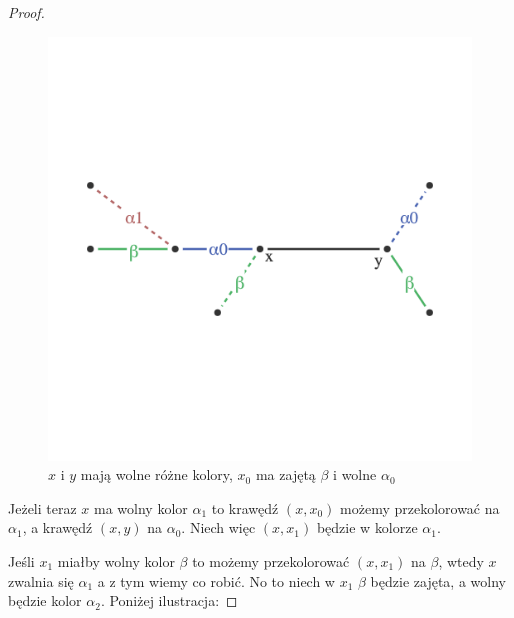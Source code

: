 \begin{proof}
        \begin{figure}[ht]
            \centering
            \includegraphics[scale=0.6]{chapters/dyskretna/colours/vizing/images/step_one.png}
            \caption{$x$ i $y$ mają wolne różne kolory, $x_0$ ma zajętą $\beta$ i wolne $\alpha_0$}
        \end{figure}
        
        Jeżeli teraz $x$ ma wolny kolor $\alpha_1$ to krawędź $(x, x_0)$
        możemy przekolorować na $\alpha_1$, a krawędź $(x, y)$ na $\alpha_0$. Niech więc $(x, x_1)$ będzie w kolorze $\alpha_1$.
        
        Jeśli $x_1$ miałby wolny kolor $\beta$ to możemy przekolorować $(x, x_1)$ na $\beta$, wtedy $x$ zwalnia się $\alpha_1$ a z tym wiemy co robić. 
        No to niech w $x_1$ $\beta$ będzie zajęta, a wolny będzie kolor $\alpha_2$. Poniżej ilustracja:
        

\end{proof}
